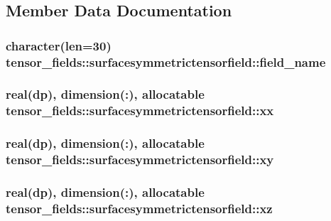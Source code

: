 \subsection{Member Data Documentation}
\hypertarget{structtensor__fields_1_1surfacesymmetrictensorfield_a7daef040982298de36e277df0dbf259c}{
\subsubsection[{field\-\_\-name}]{\setlength{\rightskip}{0pt plus 5cm}character(len=30) tensor\-\_\-fields\-::surfacesymmetrictensorfield\-::field\-\_\-name}}\label{structtensor__fields_1_1surfacesymmetrictensorfield_a7daef040982298de36e277df0dbf259c}
\hypertarget{structtensor__fields_1_1surfacesymmetrictensorfield_a8c7a65f9a32955f22ce7fde065b59f33}{
\subsubsection[{xx}]{\setlength{\rightskip}{0pt plus 5cm}real(dp), dimension(\-:), allocatable tensor\-\_\-fields\-::surfacesymmetrictensorfield\-::xx}}\label{structtensor__fields_1_1surfacesymmetrictensorfield_a8c7a65f9a32955f22ce7fde065b59f33}
\hypertarget{structtensor__fields_1_1surfacesymmetrictensorfield_aae2145d23c4e1db7dd0fcaf3c757ca4e}{
\subsubsection[{xy}]{\setlength{\rightskip}{0pt plus 5cm}real(dp), dimension(\-:), allocatable tensor\-\_\-fields\-::surfacesymmetrictensorfield\-::xy}}\label{structtensor__fields_1_1surfacesymmetrictensorfield_aae2145d23c4e1db7dd0fcaf3c757ca4e}
\hypertarget{structtensor__fields_1_1surfacesymmetrictensorfield_adad9c754591e3e46c6e6529aeae618e4}{
\subsubsection[{xz}]{\setlength{\rightskip}{0pt plus 5cm}real(dp), dimension(\-:), allocatable tensor\-\_\-fields\-::surfacesymmetrictensorfield\-::xz}}\label{structtensor__fields_1_1surfacesymmetrictensorfield_adad9c754591e3e46c6e6529aeae618e4}
